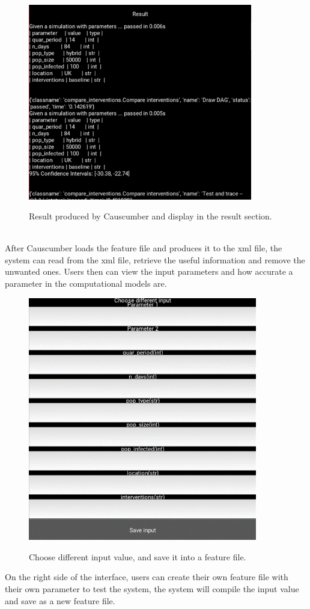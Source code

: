 \begin{figure}[h]
	\centering
	\includegraphics[width=9.8cm]{figures/Result_display.png}\\
	\caption{Result produced by Causcumber and display in the result section.}
	\label{fig:figure6}
\end{figure}\\
After Causcumber loads the feature file and produces it to the xml file, the system can read from the xml file, retrieve the useful information and remove the unwanted ones. Users then can view the input parameters and how accurate a parameter in the computational models are.
\begin{figure}[h]
	\centering
	\includegraphics[width=10cm]{figures/Input_section.png}\\
	\caption{Choose different input value, and save it into a feature file.}
	\label{fig:figure7}
\end{figure}
\newpage \noindent On the right side of the interface, users can create their own feature file with their own parameter to test the system, the system will compile the input value and save as a new feature file.

